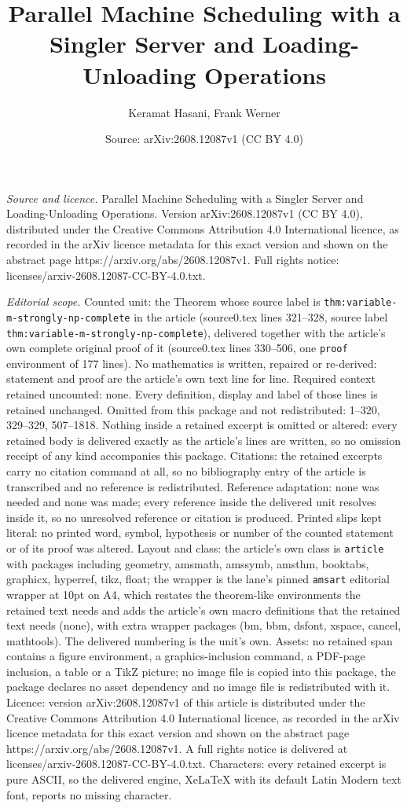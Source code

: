 \documentclass[10pt,a4paper]{amsart}
\title[Parallel Machine Scheduling with a Singler Server and Loadin]{Parallel Machine Scheduling with a Singler Server and Loading-Unloading Operations}
\author{Keramat Hasani, Frank Werner}
\date{Source: arXiv:2608.12087v1 (CC BY 4.0)}
\begin{document}
\maketitle

\noindent\emph{Source and licence.} Parallel Machine Scheduling with a Singler Server and Loading-Unloading Operations. Version arXiv:2608.12087v1 (CC BY 4.0), distributed under the Creative Commons Attribution 4.0 International licence, as recorded in the arXiv licence metadata for this exact version and shown on the abstract page https://arxiv.org/abs/2608.12087v1. Full rights notice: licenses/arxiv-2608.12087-CC-BY-4.0.txt.\par\smallskip

\noindent\textit{Editorial scope.} Counted unit: the Theorem whose source label is \texttt{thm:variable-m-strongly-np-complete} in the article (source0.tex lines 321--328, source label \texttt{thm:variable-m-strongly-np-complete}), delivered together with the article's own complete original proof of it (source0.tex lines 330--506, one \texttt{proof} environment of 177 lines). No mathematics is written, repaired or re-derived: statement and proof are the article's own text line for line. Required context retained uncounted: none. Every definition, display and label of those lines is retained unchanged. Omitted from this package and not redistributed: 1--320, 329--329, 507--1818. Nothing inside a retained excerpt is omitted or altered: every retained body is delivered exactly as the article's lines are written, so no omission receipt of any kind accompanies this package. Citations: the retained excerpts carry no citation command at all, so no bibliography entry of the article is transcribed and no reference is redistributed. Reference adaptation: none was needed and none was made; every reference inside the delivered unit resolves inside it, so no unresolved reference or citation is produced. Printed slips kept literal: no printed word, symbol, hypothesis or number of the counted statement or of its proof was altered. Layout and class: the article's own class is \texttt{article} with packages including geometry, amsmath, amssymb, amsthm, booktabs, graphicx, hyperref, tikz, float; the wrapper is the lane's pinned \texttt{amsart} editorial wrapper at 10pt on A4, which restates the theorem-like environments the retained text needs and adds the article's own macro definitions that the retained text needs (none), with extra wrapper packages (bm, bbm, dsfont, xspace, cancel, mathtools). The delivered numbering is the unit's own. Assets: no retained span contains a figure environment, a graphics-inclusion command, a PDF-page inclusion, a table or a TikZ picture; no image file is copied into this package, the package declares no asset dependency and no image file is redistributed with it. Licence: version arXiv:2608.12087v1 of this article is distributed under the Creative Commons Attribution 4.0 International licence, as recorded in the arXiv licence metadata for this exact version and shown on the abstract page https://arxiv.org/abs/2608.12087v1. A full rights notice is delivered at licenses/arxiv-2608.12087-CC-BY-4.0.txt. Characters: every retained excerpt is pure ASCII, so the delivered engine, XeLaTeX with its default Latin Modern text font, reports no missing character.
\end{document}
